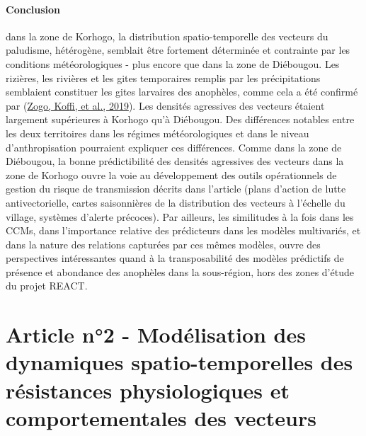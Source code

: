 \documentclass[12pt,twoside]{reedthesis}
\begin{document}
\hypertarget{conclusion}{%
\subsubsection{Conclusion}\label{conclusion}}

dans la zone de Korhogo, la distribution spatio-temporelle des vecteurs du paludisme, hétérogène, semblait être fortement déterminée et contrainte par les conditions météorologiques - plus encore que dans la zone de Diébougou. Les rizières, les rivières et les gites temporaires remplis par les précipitations semblaient constituer les gites larvaires des anophèles, comme cela a été confirmé par (\protect\hyperlink{ref-zogo_identification_2019}{Zogo, Koffi, et al., 2019}). Les densités agressives des vecteurs étaient largement supérieures à Korhogo qu'à Diébougou. Des différences notables entre les deux territoires dans les régimes météorologiques et dans le niveau d'anthropisation pourraient expliquer ces différences. Comme dans la zone de Diébougou, la bonne prédictibilité des densités agressives des vecteurs dans la zone de Korhogo ouvre la voie au développement des outils opérationnels de gestion du risque de transmission décrits dans l'article (plans d'action de lutte antivectorielle, cartes saisonnières de la distribution des vecteurs à l'échelle du village, systèmes d'alerte précoces). Par ailleurs, les similitudes à la fois dans les CCMs, dans l'importance relative des prédicteurs dans les modèles multivariés, et dans la nature des relations capturées par ces mêmes modèles, ouvre des perspectives intéressantes quand à la transposabilité des modèles prédictifs de présence et abondance des anophèles dans la sous-région, hors des zones d'étude du projet REACT.

\hypertarget{data-mining-resistances}{%
\chapter{Article n°2 - Modélisation des dynamiques spatio-temporelles des résistances physiologiques et comportementales des vecteurs}\label{data-mining-resistances}}
\end{document}
